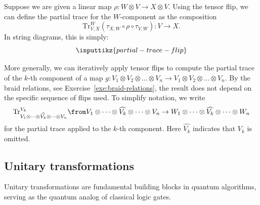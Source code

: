 \documentclass[a4paper,oneside, 12pt]{amsart}
\begin{document}
\begin{remark}\label{rmk:partial-traces-at-arbitrary-inputs}
  Suppose we are given a linear map \( \rho \colon W \otimes V \to X \otimes V \).
  Using the tensor flip, we can define the partial trace for the \( W \)-component as the composition
  \begin{equation}
    \mathrm{Tr}^{W}_{V,X}(\tau_{X,W} \circ \rho \circ \tau_{V,W}) \colon V \to X.
  \end{equation}
  In string diagrams, this is simply:
  \begin{equation*}
    \inputtikz{partial-trace-flip}
  \end{equation*}

  More generally, we can iteratively apply tensor flips to compute the partial trace of the \( k \)-th component of a map \( g \colon V_1 \otimes V_2 \otimes \dots \otimes V_n \to V_1 \otimes V_2 \otimes \dots \otimes V_n \).
  By the braid relations, see Exercise~\ref{exe:braid-relations}, the result does not depend on the specific sequence of flips used.
  To simplify notation, we write
   \begin{equation}
     \mathrm{Tr}^{V_k}_{V_1 \otimes \dots \otimes \widehat{V_k} \otimes \dots \otimes V_n} \from V_1 \otimes \dots \otimes \widehat{V_k} \otimes \dots \otimes V_n \to
     W_1 \otimes \dots \otimes \widehat{V_k} \otimes \dots \otimes W_n
   \end{equation}
   for the partial trace applied to the \( k \)-th component.
   Here \(\widehat{V_k}\) indicates that \( V_k \) is omitted.
\end{remark}


\subsection{Unitary transformations}\label{sec:unitary-transformations}

Unitary transformations are fundamental building blocks in quantum algorithms, serving as the quantum analog of classical logic gates.
\end{document}
